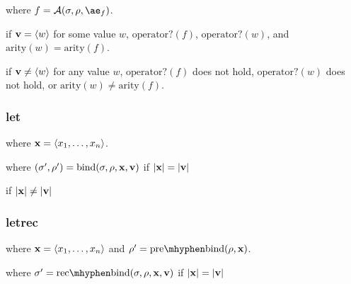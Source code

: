 \documentclass{sigplanconf}
\begin{document}

\noindent
{}

\noindent
where $f=\A{\sigma}{\rho}{\ae_f}$.

\noindent
{}

\noindent
if $\mathbf{v}=\langle w\rangle$ for some value $w$, $\mathrm{operator?}(f)$, $\mathrm{operator?}(w)$, and $\mathrm{arity}(w)=\mathrm{arity}(f)$.

\noindent
{}

\noindent
if $\mathbf{v}\ne\langle w\rangle$ for any value $w$, $\mathrm{operator?}(f)$ does not hold, $\mathrm{operator?}(w)$ does not hold, or $\mathrm{arity}(w)\ne\mathrm{arity}(f)$.

\subsubsection{let}

\noindent
{}

\noindent
where $\mathbf{x}=\langle x_1,\dots,x_n\rangle$.


\noindent
where $(\sigma',\rho')=\mathrm{bind}(\sigma,\rho,\mathbf{x},\mathbf{v})$ if $|\mathbf{x}|=|\mathbf{v}|$

 if $|\mathbf{x}|\ne|\mathbf{v}|$

\subsubsection{letrec}

\noindent
{}

\noindent
where $\mathbf{x}=\langle x_1,\dots,x_n\rangle$ and $\rho'=\prebind{\rho}{\vx}$.


\noindent
where $\sigma'=\recbind{\sigma}{\rho}{\vx}{\vv}$ if $|\mathbf{x}|=|\mathbf{v}|$
\end{document}
